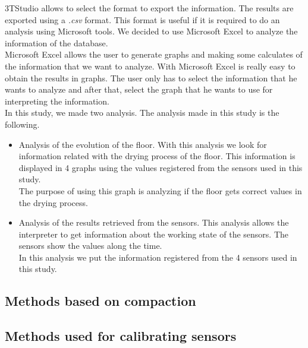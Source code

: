3TStudio allows to select the format to export the information. The results are exported using a \textit{.csv} format. This format is useful if it is required to do an analysis using Microsoft tools. We decided to use Microsoft Excel to analyze the information of the database.\\


Microsoft Excel allows the user to generate graphs and making some calculates of the information that we want to analyze. With Microsoft Excel is really easy to obtain the results in graphs. The user only has to select the information that he wants to analyze and after that, select the graph that he wants to use for interpreting the information.\\

In this study, we made two analysis. The analysis made in this study is the following.

\begin{itemize}

\item Analysis of the evolution of the floor. With this analysis we look for information related with the drying process of the floor. This information is displayed in 4 graphs using the values registered from the sensors used in this study.\\

The purpose of using this graph is analyzing if the floor gets correct values in the drying process.

\item Analysis of the results retrieved from the sensors. This analysis allows the interpreter to get information about the working state of the sensors. The sensors show the values along the time.\\

In this analysis we put the information registered from the 4 sensors used in this study.

\end{itemize}

\subsection{Methods based on compaction}

\subsection{Methods used for calibrating sensors}

